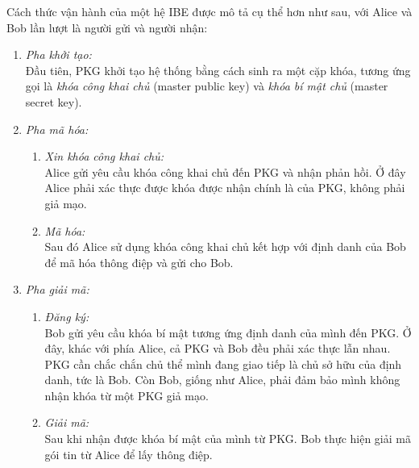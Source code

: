 \documentclass[class=report, crop=false]{standalone}
\begin{document}
		Cách thức vận hành của một hệ IBE được mô tả cụ thể hơn như sau, với Alice và Bob lần lượt là người gửi và người nhận:
		\vspace{-0.5cm}
		\begin{enumerate}
			\item \textit{Pha khởi tạo:} \\[0.2\baselineskip]
			Đầu tiên, PKG khởi tạo hệ thống bằng cách sinh ra một cặp khóa, tương ứng gọi là \textit{khóa công khai chủ} (master public key) và \textit{khóa bí mật chủ} (master secret key).
			\item \textit{Pha mã hóa:}
			\begin{enumerate}
				\item \textit{Xin khóa công khai chủ:} \\
				Alice gửi yêu cầu khóa công khai chủ đến PKG và nhận phản hồi. Ở đây Alice phải xác thực được khóa được nhận chính là của PKG, không phải giả mạo.
				\item \textit{Mã hóa:} \\
				Sau đó Alice sử dụng khóa công khai chủ kết hợp với định danh của Bob để mã hóa thông điệp và gửi cho Bob.
			\end{enumerate}
			\item \textit{Pha giải mã:}
			\begin{enumerate}
				\item \textit{Đăng ký:} \\
				Bob gửi yêu cầu khóa bí mật tương ứng định danh của mình đến PKG. Ở đây, khác với phía Alice, cả PKG và Bob đều phải xác thực lẫn nhau. PKG cần chắc chắn chủ thể mình đang giao tiếp là chủ sở hữu của định danh, tức là Bob. Còn Bob, giống như Alice, phải đảm bảo mình không nhận khóa từ một PKG giả mạo.
				\item \textit{Giải mã:} \\
				Sau khi nhận được khóa bí mật của mình từ PKG. Bob thực hiện giải mã gói tin từ Alice để lấy thông điệp.
			\end{enumerate}
		\end{enumerate}
		
\end{document}
